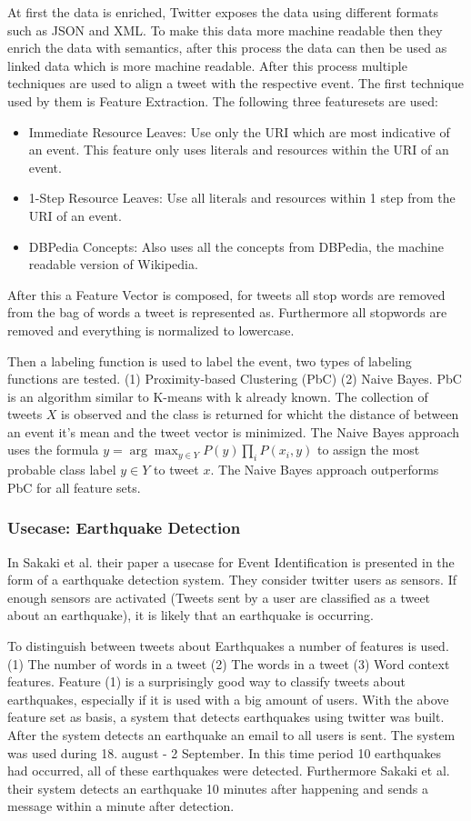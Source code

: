 \documentclass{article}
\begin{document}
At first the data is enriched, Twitter exposes the data using different formats such as JSON and XML. To make this data more machine readable then they enrich the data with semantics, after this process the data can then  be used as linked data which is more machine readable. After this process multiple techniques are used to align a tweet with the respective event. The first technique used by them is Feature Extraction. \cite{eventalign} The following three featuresets are used:
\begin{itemize}

  \item Immediate Resource Leaves: Use only the URI which are most indicative of an event. This feature only uses literals and resources within the URI of an event. 
  \item 1-Step Resource Leaves: Use all literals and resources within 1 step from the URI of an event. 
  \item DBPedia Concepts: Also uses all the concepts from DBPedia, the machine readable version of Wikipedia.
\end{itemize}
After this a Feature Vector is composed, for tweets all stop words are removed from the bag of words a tweet is represented as. Furthermore all stopwords are removed and everything is normalized to lowercase. \cite{eventalign} 

Then a labeling function is used to label the event, two types of labeling functions are tested. (1) Proximity-based Clustering (PbC) (2) Naive Bayes. PbC is an algorithm similar to K-means with k already known. The collection of tweets $X$ is observed and the class is returned for whicht the distance of between an event it's mean and the tweet vector is minimized. The Naive Bayes approach uses the formula $y = \arg\max_{y \in Y} P(y)\prod_i P(x_i, y)$ to assign the most probable class label $y \in Y$ to tweet $x$. The Naive Bayes approach outperforms PbC for all feature sets.  \cite{eventalign}
\subsubsection{Usecase: Earthquake Detection}
In Sakaki et al. their paper a usecase for Event Identification is presented in the form of a earthquake detection system. \cite{earthq} They consider twitter users as sensors. If enough sensors are activated (Tweets sent by a user are classified as a tweet about an earthquake), it is likely that an earthquake is occurring. 

To distinguish between tweets about Earthquakes a number of features is used. (1) The number of words in a tweet (2) The words in a tweet (3) Word context features. Feature (1) is a surprisingly good way to classify tweets about earthquakes, especially if it is used with a big amount of users. With the above feature set as basis, a system that detects earthquakes using twitter was built. After the system detects an earthquake an email to all users is sent. The system was used during 18. august - 2 September. In this time period 10 earthquakes had occurred, all of these earthquakes were detected. Furthermore Sakaki et al. their system detects an earthquake 10 minutes after happening and sends a message within a minute after detection. 
\cite{earthq}
\newpage
\end{document}
